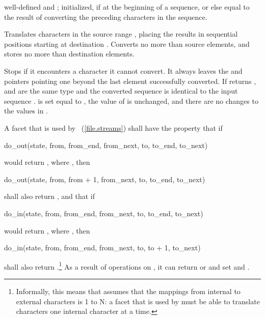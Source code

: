 \begin{itemdescr}
\pnum
\preconditions
{}
well-defined and
;
 initialized, if at the beginning of a sequence, or else equal to
the result of converting the preceding characters in the sequence.

\pnum
\effects
Translates characters in the source range
\tcode{[from,from_end)},
placing the results in sequential positions starting at destination .
Converts no more than
source elements, and
stores no more than
destination elements.

Stops if it encounters a character it cannot convert.
It always leaves the  and  pointers
pointing one beyond the last element successfully converted.
If returns
,
and
are the same type and the converted sequence is
identical to the input sequence
\tcode{[from, from_next)}.
 is set equal to , the value of  is
unchanged, and there are no changes to the values in
\tcode{[to, to_end)}.

\pnum
A
facet that is used by
~(\ref{file.streams}) shall have the property that if
\begin{codeblock}
do_out(state, from, from_end, from_next, to, to_end, to_next)
\end{codeblock}
would return
,
where
,
then
\begin{codeblock}
do_out(state, from, from + 1, from_next, to, to_end, to_next)
\end{codeblock}
shall also return
,
and that if
\begin{codeblock}
do_in(state, from, from_end, from_next, to, to_end, to_next)
\end{codeblock}
would return
,
where
,
then
\begin{codeblock}
do_in(state, from, from_end, from_next, to, to + 1, to_next)
\end{codeblock}
shall also return
.\footnote{Informally, this means that
assumes that the mappings from internal to external characters is
1 to N: a
facet that is used by
must be able to translate characters one internal character at a time.
}
\enternote As a result of operations on , it can return  or  and set  and . \exitnote


\end{itemdescr}
